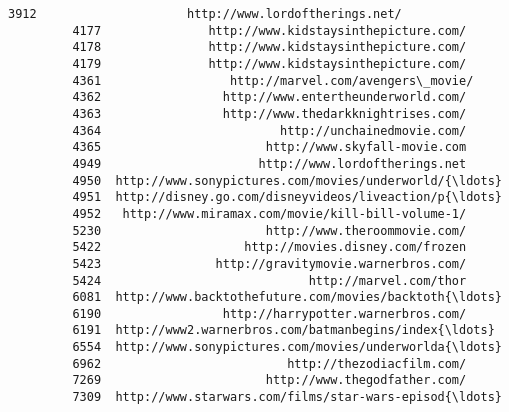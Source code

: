 \documentclass[11pt]{article}
\begin{document}
\begin{Verbatim}[commandchars=\\\{\}]
         3912                     http://www.lordoftherings.net/   
         4177               http://www.kidstaysinthepicture.com/   
         4178               http://www.kidstaysinthepicture.com/   
         4179               http://www.kidstaysinthepicture.com/   
         4361                  http://marvel.com/avengers\_movie/   
         4362                 http://www.entertheunderworld.com/   
         4363                 http://www.thedarkknightrises.com/   
         4364                         http://unchainedmovie.com/   
         4365                       http://www.skyfall-movie.com   
         4949                      http://www.lordoftherings.net   
         4950  http://www.sonypictures.com/movies/underworld/{\ldots}   
         4951  http://disney.go.com/disneyvideos/liveaction/p{\ldots}   
         4952   http://www.miramax.com/movie/kill-bill-volume-1/   
         5230                       http://www.theroommovie.com/   
         5422                    http://movies.disney.com/frozen   
         5423                http://gravitymovie.warnerbros.com/   
         5424                             http://marvel.com/thor   
         6081  http://www.backtothefuture.com/movies/backtoth{\ldots}   
         6190                 http://harrypotter.warnerbros.com/   
         6191  http://www2.warnerbros.com/batmanbegins/index{\ldots}   
         6554  http://www.sonypictures.com/movies/underworlda{\ldots}   
         6962                          http://thezodiacfilm.com/   
         7269                       http://www.thegodfather.com/   
         7309  http://www.starwars.com/films/star-wars-episod{\ldots}   
         

\end{Verbatim}
\end{document}

